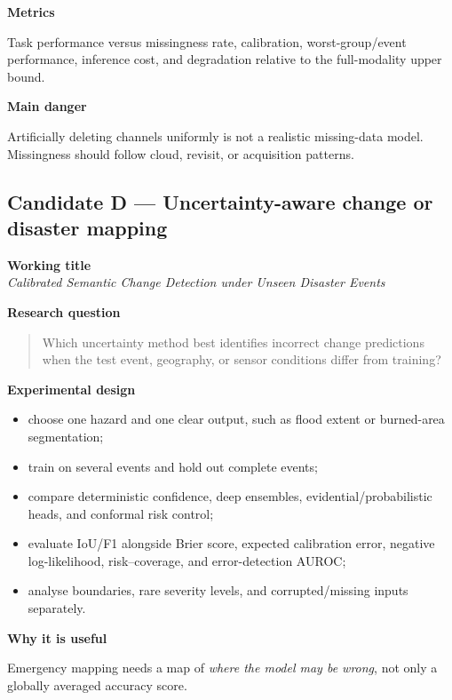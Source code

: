 \documentclass[
  a4paper,
  11pt]{article}
\providecommand{\tightlist}{%
  \setlength{\itemsep}{0pt}\setlength{\parskip}{0pt}}
\begin{document}
\textbf{Metrics}

Task performance versus missingness rate, calibration, worst-group/event
performance, inference cost, and degradation relative to the
full-modality upper bound.

\textbf{Main danger}

Artificially deleting channels uniformly is not a realistic missing-data
model. Missingness should follow cloud, revisit, or acquisition
patterns.

\hypertarget{candidate-d-uncertainty-aware-change-or-disaster-mapping}{%
\subsection{Candidate D --- Uncertainty-aware change or disaster
mapping}\label{candidate-d-uncertainty-aware-change-or-disaster-mapping}}

\textbf{Working title}\\
\emph{Calibrated Semantic Change Detection under Unseen Disaster Events}

\textbf{Research question}

\begin{quote}
Which uncertainty method best identifies incorrect change predictions
when the test event, geography, or sensor conditions differ from
training?
\end{quote}

\textbf{Experimental design}

\begin{itemize}
\tightlist
\item
  choose one hazard and one clear output, such as flood extent or
  burned-area segmentation;
\item
  train on several events and hold out complete events;
\item
  compare deterministic confidence, deep ensembles,
  evidential/probabilistic heads, and conformal risk control;
\item
  evaluate IoU/F1 alongside Brier score, expected calibration error,
  negative log-likelihood, risk--coverage, and error-detection AUROC;
\item
  analyse boundaries, rare severity levels, and corrupted/missing inputs
  separately.
\end{itemize}

\textbf{Why it is useful}

Emergency mapping needs a map of \emph{where the model may be wrong},
not only a globally averaged accuracy score.
\end{document}
